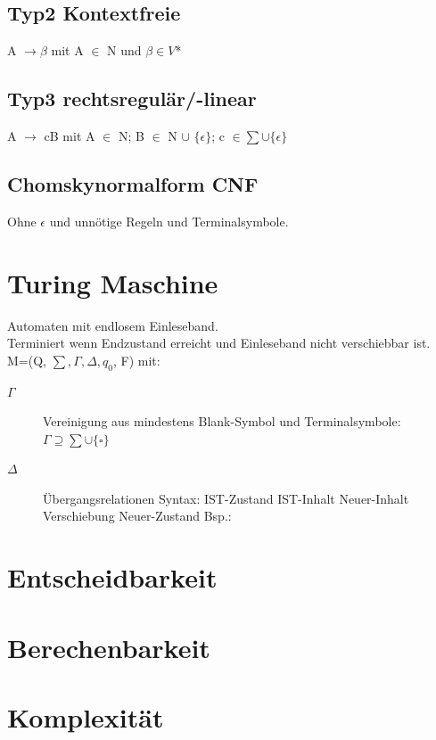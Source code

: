 \documentclass[12pt,a4paper]{article}
\begin{document}
    \subsection{Typ2 Kontextfreie}
      A $\rightarrow \beta$ mit A $\in$ N und $\beta \in V$*
    \subsection{Typ3 rechtsregulär/-linear}
      A $\rightarrow$ cB mit A $\in$ N; B $\in$ N $\cup$ $\{ \epsilon \}$; c $\in \sum \cup \{ \epsilon \}$
    \subsection{Chomskynormalform CNF}
      Ohne $\epsilon$ und unnötige Regeln und Terminalsymbole.\\

\section{Turing Maschine}
	Automaten mit endlosem Einleseband.\\
	Terminiert wenn Endzustand erreicht und Einleseband nicht verschiebbar ist.\\
	M=(Q, $\sum, \Gamma , \Delta , q_0$, F) mit:\\
	\begin{description}
		\item[$\Gamma$] Vereinigung aus mindestens Blank-Symbol und Terminalsymbole: $\Gamma \supseteq \sum \cup \{ \square \} $
		\item[$\Delta$] Übergangsrelationen Syntax: IST-Zustand IST-Inhalt Neuer-Inhalt Verschiebung Neuer-Zustand Bsp.: 
	\end{description}

\section{Entscheidbarkeit}

\section{Berechenbarkeit}

\section{Komplexität}
\end{document}
